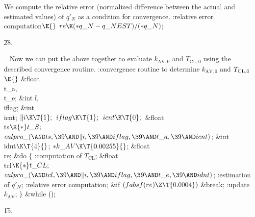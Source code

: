 \documentclass[letterpaper,12pt,baseclass=report]{cweb-hy}
\begin{document}
{
We compute the relative error (normalized difference between the  actual and
estimated
values) of $q'_N$ as a condition for convergence.
\Y\B\4:relative error computation\X${}\E{}$\6
$\\{re}\K({*}\\{q\_N}-\\{q\_NEST})/({*}\\{q\_N}){}$;\par
\U28.\fi

~\newline
Now we can put the above together to
evaluate $k_{\text{AV},0}$ and $T_{\text{CL},0}$ using the described
convergence routine.
\Y\B\4:convergence routine to determine $k_{\text{AV},0}$ and $T_{%
\text{CL},0}$\X${}\E{}$\6
\&{float} \\{t\_a}${},{}$ \\{t\_e};\6
\&{int} \|i${},{}$ \\{iflag};\6
\&{int} \\{icnt};\7
${}\|i\K\T{1};{}$\6
${}\\{iflag}\K\T{1};{}$\6
${}\\{icnt}\K\T{0};{}$\7
\&{float} \\{ts}${}\K{*}\\{t\_S};{}$\7
${}\\{calpro\_}({\AND}\\{ts},\39{\AND}\|i,\39{\AND}\\{iflag},\39{\AND}\\{t\_a},%
\39{\AND}\\{icnt}){}$;\7
\&{int} \\{idnt}${}\K\T{4}{}$;\7
${}{*}\\{k\_AV}\K\T{0.00255}{}$;\7
\&{float} \\{re};\7
\&{do}\5
${}\{{}$\1\6
:computation of $T_{\mathrm{CL}}$\X;\7
\&{float} \\{tcl}${}\K{*}\\{t\_CL};{}$\7
${}\\{calpro\_}({\AND}\\{tcl},\39{\AND}\|i,\39{\AND}\\{iflag},\39{\AND}\\{t%
\_e},\39{\AND}\\{idnt}){}$;\6
:estimation of $q'_N$\X;\6
:relative error computation\X;\6
\&{if} ${}(\\{fabsf}(\\{re})\Z\T{0.0004}){}$\1\5
\&{break};\2\6
:update $k_{\mathrm{AV}}$\X;\6
\4${}\}{}$\2\5
\&{while} ();\par
\U15.\fi

}
\end{document}
